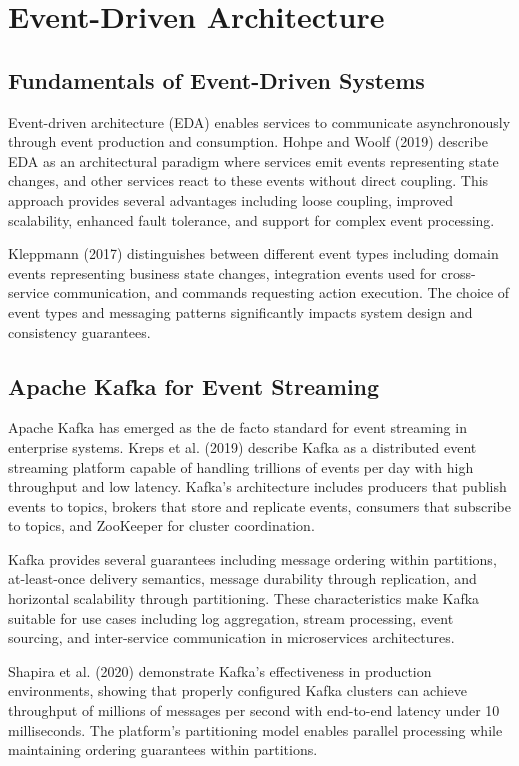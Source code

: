 \section{Event-Driven Architecture}

\subsection{Fundamentals of Event-Driven Systems}

Event-driven architecture (EDA) enables services to communicate asynchronously through event production and consumption. Hohpe and Woolf (2019) describe EDA as an architectural paradigm where services emit events representing state changes, and other services react to these events without direct coupling. This approach provides several advantages including loose coupling, improved scalability, enhanced fault tolerance, and support for complex event processing.

Kleppmann (2017) distinguishes between different event types including domain events representing business state changes, integration events used for cross-service communication, and commands requesting action execution. The choice of event types and messaging patterns significantly impacts system design and consistency guarantees.

\subsection{Apache Kafka for Event Streaming}

Apache Kafka has emerged as the de facto standard for event streaming in enterprise systems. Kreps et al. (2019) describe Kafka as a distributed event streaming platform capable of handling trillions of events per day with high throughput and low latency. Kafka's architecture includes producers that publish events to topics, brokers that store and replicate events, consumers that subscribe to topics, and ZooKeeper for cluster coordination.

Kafka provides several guarantees including message ordering within partitions, at-least-once delivery semantics, message durability through replication, and horizontal scalability through partitioning. These characteristics make Kafka suitable for use cases including log aggregation, stream processing, event sourcing, and inter-service communication in microservices architectures.

Shapira et al. (2020) demonstrate Kafka's effectiveness in production environments, showing that properly configured Kafka clusters can achieve throughput of millions of messages per second with end-to-end latency under 10 milliseconds. The platform's partitioning model enables parallel processing while maintaining ordering guarantees within partitions.

